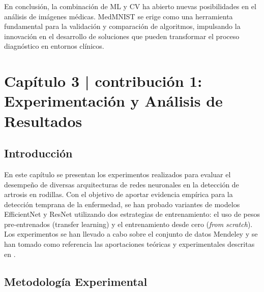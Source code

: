 \documentclass[11pt,spanish,listoffigures,listoftables]{tfgetsinf}
\begin{document}
En conclusión, la combinación de ML y CV ha abierto nuevas posibilidades en el análisis de imágenes médicas. MedMNIST se erige como una herramienta fundamental para la validación y comparación de algoritmos, impulsando la innovación en el desarrollo de soluciones que pueden transformar el proceso diagnóstico en entornos clínicos.



\chapter{Capítulo 3 | contribución 1: Experimentación y Análisis de Resultados}

\section{Introducción}
En este capítulo se presentan los experimentos realizados para evaluar el desempeño de diversas arquitecturas de redes neuronales en la detección de artrosis en rodillas. Con el objetivo de aportar evidencia empírica para la detección temprana de la enfermedad, se han probado variantes de modelos EfficientNet y ResNet utilizando dos estrategias de entrenamiento: el uso de pesos pre-entrenados (transfer learning) y el entrenamiento desde cero (\textit{from scratch}). Los experimentos se han llevado a cabo sobre el conjunto de datos Mendeley \cite{chen2018knee} y se han tomado como referencia las aportaciones teóricas y experimentales descritas en \cite{efficientnet_paper}. 

\section{Metodología Experimental}
\end{document}
